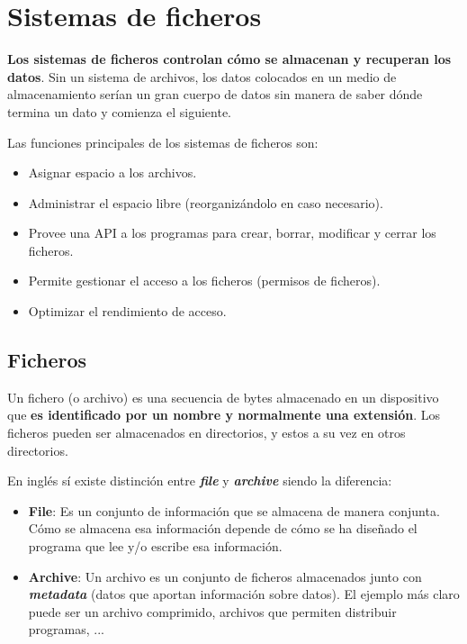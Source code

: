 \section{Sistemas de ficheros}
\textbf{Los sistemas de ficheros controlan cómo se almacenan y recuperan los datos}. Sin un sistema de archivos, los datos colocados en un medio de almacenamiento serían un gran cuerpo de datos sin manera de saber dónde termina un dato y comienza el siguiente.


Las funciones principales de los sistemas de ficheros son:

\begin{itemize}
    \item Asignar espacio a los archivos.
    \item Administrar el espacio libre (reorganizándolo en caso necesario).
    \item Provee una API a los programas para crear, borrar, modificar y cerrar los ficheros.
    \item Permite gestionar el acceso a los ficheros (permisos de ficheros).
    \item Optimizar el rendimiento de acceso.
\end{itemize}


\subsection{Ficheros}
Un fichero (o archivo) es una secuencia de bytes almacenado en un dispositivo que \textbf{es identificado por un nombre y normalmente una extensión}. Los ficheros pueden ser almacenados en directorios, y estos a su vez en otros directorios.

En inglés sí existe distinción entre \textbf{\textit{file}} y \textbf{\textit{archive}} siendo la diferencia:

\begin{itemize}
    \item \textbf{File}: Es un conjunto de información que se almacena de manera conjunta. Cómo se almacena esa información depende de cómo se ha diseñado el programa que lee y/o escribe esa información.
    \item \textbf{Archive}: Un archivo es un conjunto de ficheros almacenados junto con \textit{\textbf{metadata}} (datos que aportan información sobre datos). El ejemplo más claro puede ser un archivo comprimido, archivos que permiten distribuir programas, ...
\end{itemize}

